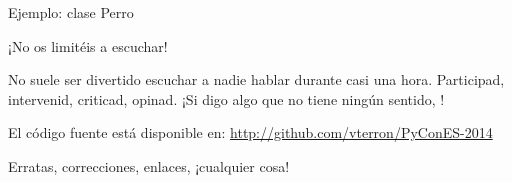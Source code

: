\begin{frame}{Ejemplo: clase Perro}
\end{frame}

\begin{frame}{¡No os limitéis a escuchar!}
  \begin{center}
    No suele ser divertido escuchar a nadie hablar durante casi una
    hora. Participad, intervenid, criticad, opinad. ¡Si digo algo que
    no tiene ningún sentido, !
  \end{center}

  \begin{block}{\centering El código fuente está disponible en:}
    \centering \url{http://github.com/vterron/PyConES-2014}
  \end{block}

  \begin{center}
    \small Erratas, correcciones, enlaces, ¡cualquier cosa!
  \end{center}
\end{frame}
